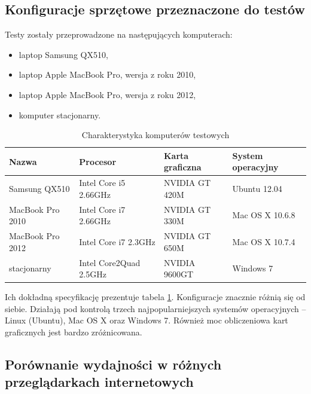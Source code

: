 \subsection{Konfiguracje sprzętowe przeznaczone do testów}
\label{sec:konfiguracjaKompow}

Testy zostały przeprowadzone na następujących komputerach:

\begin{itemize}

\item laptop Samsung QX510,
\item laptop Apple MacBook Pro, wersja z roku 2010,
\item laptop Apple MacBook Pro, wersja z roku 2012,
\item komputer stacjonarny.

\end{itemize}

\begin{table}[!h]
\caption{Charakterystyka komputerów testowych}
\centering
\begin{tabular}{|l|l|l|l|}
\hline
Nazwa & Procesor & Karta graficzna & System operacyjny \\ \hline
Samsung QX510 & Intel Core i5 2.66GHz & NVIDIA GT 420M & Ubuntu 12.04 \\ \hline
MacBook Pro 2010 & Intel Core i7 2.66GHz & NVIDIA GT 330M & Mac OS X 10.6.8 \\ \hline
MacBook Pro 2012 & Intel Core i7 2.3GHz & NVIDIA GT 650M & Mac OS X 10.7.4 \\ \hline
stacjonarny & Intel Core2Quad 2.5GHz & NVIDIA 9600GT & Windows 7 \\ \hline
\end{tabular}
\label{tab:komputery}
\end{table}

Ich dokładną specyfikację prezentuje tabela \ref{tab:komputery}.
Konfiguracje znacznie różnią się od siebie. Działają pod kontrolą trzech
najpopularniejszych systemów operacyjnych -- Linux (Ubuntu), Mac OS X oraz
Windows 7. Również moc obliczeniowa kart graficznych jest bardzo zróżnicowana.

\subsection{Porównanie wydajności w różnych przeglądarkach internetowych}
\label{sec:przegladarkiWyd}

